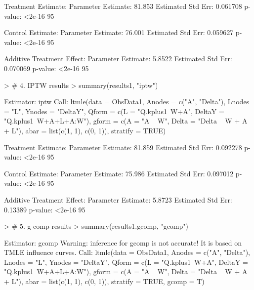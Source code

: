 \documentclass{exam}
\begin{document}
\begin{solution}
\begin{Schunk}
\begin{Soutput}
Treatment Estimate:
   Parameter Estimate:  81.853 
    Estimated Std Err:  0.061708 
              p-value:  <2e-16 
    95%

Control Estimate:
   Parameter Estimate:  76.001 
    Estimated Std Err:  0.059627 
              p-value:  <2e-16 
    95%

Additive Treatment Effect:
   Parameter Estimate:  5.8522 
    Estimated Std Err:  0.070069 
              p-value:  <2e-16 
    95%
\end{Soutput}
\end{Schunk}
\begin{Schunk}
\begin{Sinput}
> # 4. IPTW results
> summary(results1, "iptw")
\end{Sinput}
\begin{Soutput}
Estimator:  iptw 
Call:
ltmle(data = ObsData1, Anodes = c("A", "Delta"), Lnodes = "L", 
    Ynodes = "DeltaY", Qform = c(L = "Q.kplus1~W+A", DeltaY = "Q.kplus1~W+A+L+A:W"), 
    gform = c(A = "A ~ W", Delta = "Delta ~ W + A + L"), abar = list(c(1, 
        1), c(0, 1)), stratify = TRUE)

Treatment Estimate:
   Parameter Estimate:  81.859 
    Estimated Std Err:  0.092278 
              p-value:  <2e-16 
    95%

Control Estimate:
   Parameter Estimate:  75.986 
    Estimated Std Err:  0.097012 
              p-value:  <2e-16 
    95%

Additive Treatment Effect:
   Parameter Estimate:  5.8723 
    Estimated Std Err:  0.13389 
              p-value:  <2e-16 
    95%
\end{Soutput}
\end{Schunk}
\begin{Schunk}
\begin{Sinput}
> # 5. g-comp results
> summary(results1.gcomp, "gcomp")
\end{Sinput}
\begin{Soutput}
Estimator:  gcomp 
Warning: inference for gcomp is not accurate! It is based on TMLE influence curves.
Call:
ltmle(data = ObsData1, Anodes = c("A", "Delta"), Lnodes = "L", 
    Ynodes = "DeltaY", Qform = c(L = "Q.kplus1~W+A", DeltaY = "Q.kplus1~W+A+L+A:W"), 
    gform = c(A = "A ~ W", Delta = "Delta ~ W + A + L"), abar = list(c(1, 
        1), c(0, 1)), stratify = TRUE, gcomp = T)


\end{Soutput}
\end{Schunk}
\end{solution}
\end{document}
